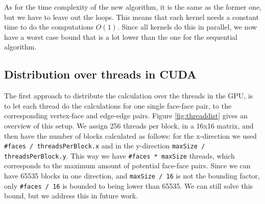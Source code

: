 As for the time complexity of the new algorithm, it is the same as the former one, but we have to leave out the loops. This means that each kernel needs a constant time to do the computations $O(1)$. Since all kernels do this in parallel, we now have a worst case bound that is a lot lower than the one for the sequential algorithm.

\subsection{Distribution over threads in CUDA}
\label{subsec:threads}
The first approach to distribute the calculation over the threads in the GPU, is to let each thread do the calculations for one single face-face pair, to the corresponding vertex-face and edge-edge pairs. Figure \ref{fig:threaddist} gives an overview of this setup. We assign 256 threads per block, in a 16x16 matrix, and then have the number of blocks calculated as follows: for the x-direction we used \texttt{\#faces / threadsPerBlock.x} and in the y-direction \texttt{maxSize / threadsPerBlock.y}. This way we have \texttt{\#faces * maxSize} threads, which corresponds to the maximum amount of potential face-face pairs. Since we can have 65535 blocks in one direction, and \texttt{maxSize / 16} is not the bounding factor, only \texttt{\#faces / 16} is bounded to being lower than 65535. We can still solve this bound, but we address this in future work.\\

